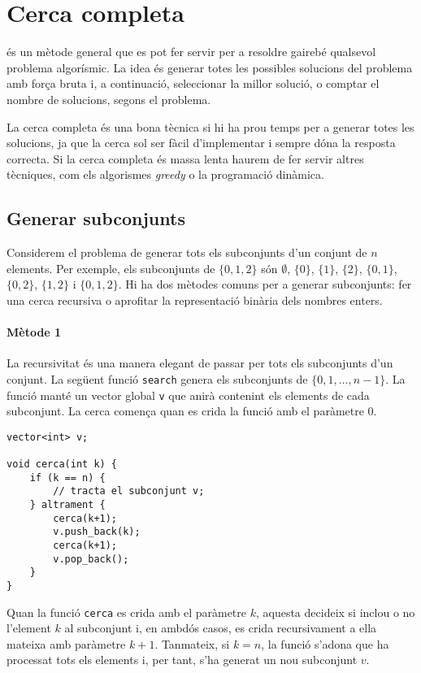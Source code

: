 \chapter{Cerca completa}

és un mètode general que es pot fer servir
per a resoldre gairebé qualsevol problema algorísmic.
La idea és generar totes les possibles
solucions del problema amb força bruta
i, a continuació, seleccionar la millor solució, o comptar
el nombre de solucions, segons el problema.

La cerca completa és una bona tècnica
si hi ha prou temps per a generar totes les solucions,
ja que la cerca sol ser fàcil d'implementar
i sempre dóna la resposta correcta.
Si la cerca completa és massa lenta haurem
de fer servir altres tècniques, com els algorismes \emph{greedy}
o la programació dinàmica.

\section{Generar subconjunts}


Considerem el problema de generar
tots els subconjunts d'un conjunt de $n$ elements.
Per exemple, els subconjunts de $\{0,1,2\}$ són
$\emptyset$, $\{0\}$, $\{1\}$, $\{2\}$, $\{0,1\}$,
$\{0,2\}$, $\{1,2\}$ i $\{0,1,2\}$.
Hi ha dos mètodes comuns per a generar subconjunts:
fer una cerca recursiva
o aprofitar la representació binària dels nombres enters.

\subsubsection{Mètode 1}

La recursivitat és una manera elegant de passar per
tots els subconjunts d'un conjunt.
La següent funció \texttt{search}
genera els subconjunts de
$\{0,1,\ldots,n-1\}$.
La funció manté un vector global \texttt{v}
que anirà contenint els elements de cada subconjunt.
La cerca comença quan es crida la funció
amb el paràmetre 0.

\begin{lstlisting}
vector<int> v;

void cerca(int k) {
    if (k == n) {
        // tracta el subconjunt v;
    } altrament {
        cerca(k+1);
        v.push_back(k);
        cerca(k+1);
        v.pop_back();
    }
}
\end{lstlisting}

Quan la funció \texttt{cerca}
es crida amb el paràmetre $k$,
aquesta decideix si inclou o no l'element $k$ al subconjunt
i, en ambdós casos,
es crida recursivament a ella mateixa amb paràmetre $k+1$.
Tanmateix, si $k=n$, la funció s'adona
que ha processat tots els elements
i, per tant, s'ha generat un nou subconjunt $v$.

